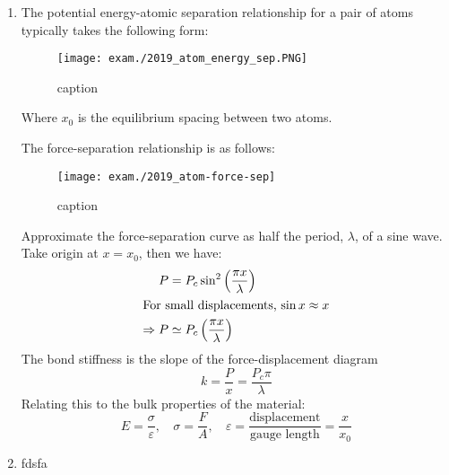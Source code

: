 \begin{enumerate}[label=(\alph*)]
    \item The potential energy-atomic separation relationship for a pair of atoms typically takes the following form:
    \begin{figure}[htb]
        \centering
        \texttt{[image: exam./2019\_atom\_energy\_sep.PNG]}
        \caption{caption}
    \end{figure}
    Where $x_0$ is the equilibrium spacing between two atoms.


    The force-separation relationship is as follows:
    \begin{figure}[htb]
        \centering
        \texttt{[image: exam./2019\_atom-force-sep]}
        \caption{caption}
    \end{figure}
    Approximate the force-separation curve as half the period, $\lambda$, of a sine wave. Take origin at $x=x_0$, then we have:
    \begin{align}
        P&=P_c \sin^2\left(\frac{\pi x}{\lambda}\right)\\%
    \intertext{For small displacements, $\sin x \approx x$}
        \Rightarrow P&\simeq P_c \left(\frac{\pi x}{\lambda}\right)%
    \end{align}
    The bond stiffness is the slope of the force-displacement diagram
    \begin{equation}
        k = \frac Px = \frac{P_c \pi}{\lambda}%
    \end{equation}
    Relating this to the bulk properties of the material:
    \begin{equation}
        E = \frac{\sigma}{\varepsilon}\text{,}\;\;\;\; \sigma = \frac FA\text{,}\;\;\;\; \varepsilon=\frac{\text{displacement}}{\text{gauge length}}=\frac{x}{x_0}%
    \end{equation}
    




    \item fdsfa 
\end{enumerate}


